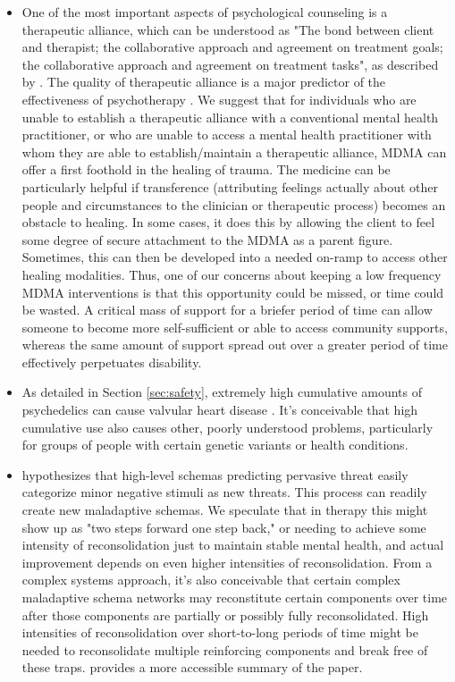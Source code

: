 \documentclass[12pt,letterpaper]{book}
\begin{document}
\begin{itemize}
    \item One of the most important aspects of psychological counseling is a therapeutic alliance, which can be understood as "The bond between client and therapist; the collaborative approach and agreement on treatment goals; the collaborative approach and agreement on treatment tasks", as described by \textcite{BRWAIdownload}. The quality of therapeutic alliance is a major predictor of the effectiveness of psychotherapy \cite{fluckiger2018alliance}. We suggest that for individuals who are unable to establish a therapeutic alliance with a conventional mental health practitioner, or who are unable to access a mental health practitioner with whom they are able to establish/maintain a therapeutic alliance, MDMA can offer a first foothold in the healing of trauma. The medicine can be particularly helpful if transference (attributing feelings actually about other people and circumstances to the clinician or therapeutic process) becomes an obstacle to healing. In some cases, it does this by allowing the client to feel some degree of secure attachment to the MDMA as a parent figure. Sometimes, this can then be developed into a needed on-ramp to access other healing modalities. Thus, one of our concerns about keeping a low frequency MDMA interventions is that this opportunity could be missed, or time could be wasted. A critical mass of support for a briefer period of time can allow someone to become more self-sufficient or able to access community supports, whereas the same amount of support spread out over a greater period of time effectively perpetuates disability.
    \item As detailed in Section \ref{sec:safety}, extremely high cumulative amounts of psychedelics can cause valvular heart disease \cite{droogmans2007valvular,tagen2023valvular}. It's conceivable that high cumulative use also causes other, poorly understood problems, particularly for groups of people with certain genetic variants or health conditions.
    \item \textcite{berghSelfEvidencing} hypothesizes that high-level schemas predicting pervasive threat easily categorize minor negative stimuli as new threats. This process can readily create new maladaptive schemas. We speculate that in therapy this might show up as "two steps forward one step back," or needing to achieve some intensity of reconsolidation just to maintain stable mental health, and actual improvement depends on even higher intensities of reconsolidation. From a complex systems approach, it's also conceivable that certain complex maladaptive schema networks may reconstitute certain components over time after those components are partially or possibly fully reconsolidated. High intensities of reconsolidation over short-to-long periods of time might be needed to reconsolidate multiple reinforcing components and break free of these traps. \textcite{alexanderPrecision} provides a more accessible summary of the paper.
\end{itemize}
\end{document}
